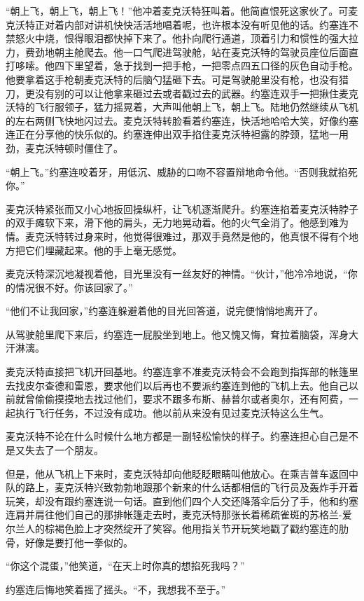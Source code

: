     “朝上飞，朝上飞，朝上飞！”他冲着麦克沃特狂叫着。他简直恨死这家伙了。可麦克沃特正对着内部对讲机快快活活地唱着呢，也许根本没有听见他的话。约塞连不禁怒火中烧，恨得眼泪都快掉下来了。他扑向爬行通道，顶着引力和惯性的强大拉力，费劲地朝主舱爬去。他一口气爬进驾驶舱，站在麦克沃特的驾驶员座位后面直打哆嗦。他四下里望着，急于找到一把手枪，一把零点四五口径的灰色自动手枪。他要拿着这手枪朝麦克沃特的后脑勺猛砸下去。可是驾驶舱里没有枪，也没有猎刀，更没有别的可以让他拿来砸过去或者戳过去的武器。约塞连双手一把揪住麦克沃特的飞行服领子，猛力摇晃着，大声叫他朝上飞，朝上飞。陆地仍然继续从飞机的左右两侧飞快地闪过去。麦克沃特转脸看着约塞连，快活地哈哈大笑，好像约塞连正在分享他的快乐似的。约塞连伸出双手掐住麦克沃特袒露的脖颈，猛地一用劲，麦克沃特顿时僵住了。

    “朝上飞。”约塞连咬着牙，用低沉、威胁的口吻不容置辩地命令他。“否则我就掐死你。”

    麦克沃特紧张而又小心地扳回操纵杆，让飞机逐渐爬升。约塞连掐着麦克沃特脖子的双手瘫软下来，滑下他的肩头，无力地晃动着。他的火气全消了。他感到难为情。麦克沃特转过身来时，他觉得很难过，那双手竟然是他的，他真恨不得有个地方把它们埋藏起来。他的手上毫无感觉。

    麦克沃特深沉地凝视着他，目光里没有一丝友好的神情。“伙计，”他冷冷地说，“你的情况很不好。你该回家了。”

    “他们不让我回家，”约塞连躲避着他的目光回答道，说完便悄悄地离开了。

    从驾驶舱里爬下来后，约塞连一屁股坐到地上。他又愧又悔，耷拉着脑袋，浑身大汗淋漓。

    麦克沃特直接把飞机开回基地。约塞连拿不准麦克沃特会不会跑到指挥部的帐篷里去找皮尔查德和雷恩，要求他们以后再也不要派约塞连到他的飞机上去。他自己以前就曾偷偷摸摸地去找过他们，要求不跟多布斯、赫普尔或者奥尔，还有阿费，一起执行飞行任务，不过没有成功。他以前从来没有见过麦克沃特这么生气。

    麦克沃特不论在什么时候什么地方都是一副轻松愉快的样子。约塞连担心自己是不是又失去了一个朋友。

    但是，他从飞机上下来时，麦克沃特却向他眨眨眼睛叫他放心。在乘吉普车返回中队的路上，麦克沃特兴致勃勃地跟那个新来的什么话都相信的飞行员及轰炸手开着玩笑，却没有跟约塞连说一句话。直到他们四个人交还降落伞后分了手，他和约塞连肩并肩往他们自己的那排帐篷走去时，麦克沃特那张长着稀疏雀斑的苏格兰-爱尔兰人的棕褐色脸上才突然绽开了笑容。他用指关节开玩笑地戳了戳约塞连的肋骨，好像是要打他一拳似的。

    “你这个混蛋，”他笑道，“在天上时你真的想掐死我吗？”

    约塞连后悔地笑着摇了摇头。“不，我想我不至于。”

